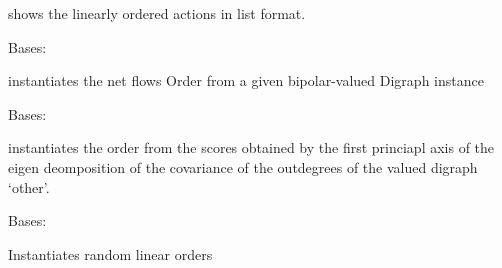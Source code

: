 \documentclass[letterpaper,10pt,english]{sphinxmanual}
\begin{document}
\begin{fulllineitems}
\begin{fulllineitems}
\end{fulllineitems}


\begin{fulllineitems}
\label{techDoc:linearOrders.LinearOrder.showRanking}
shows the linearly ordered actions in list format.

\end{fulllineitems}


\end{fulllineitems}


\begin{fulllineitems}
\label{techDoc:linearOrders.NetFlowsOrder}
Bases: {\hyperref[techDoc:linearOrders.LinearOrder]{\emph{}}}

instantiates the net flows Order from
a given bipolar-valued Digraph instance

\end{fulllineitems}


\begin{fulllineitems}
\label{techDoc:linearOrders.PrincipalOrder}
Bases: {\hyperref[techDoc:linearOrders.LinearOrder]{\emph{}}}

instantiates the order from the scores obtained by the first
princiapl axis of the eigen deomposition of the covariance of the
outdegrees of the valued digraph `other'.

\end{fulllineitems}


\begin{fulllineitems}
\label{techDoc:linearOrders.RandomLinearOrder}
Bases: {\hyperref[techDoc:linearOrders.LinearOrder]{\emph{}}}

Instantiates random linear orders

\end{fulllineitems}
\end{document}
